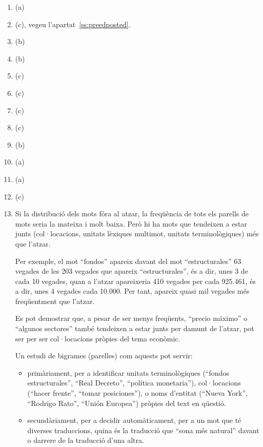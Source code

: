 \begin{enumerate}
\item (a)
\item (c), vegeu l'apartat~\ref{ss:preedposted}.
\item (b)
\item (b)
\item (c)
\item (c)
\item (c)
\item (c)
\item (b)
\item (a)
\item (a)
\item (c)
\item Si la distribució dels mots fóra al atzar, la freqüència de tots
  els parells de mots seria la mateixa i molt baixa. Però hi ha mots
  que tendeixen a estar junts (col·locacions, unitats lèxiques
  multimot, unitats terminològiques) més que l'atzar.

  Per exemple, el mot ``fondos'' apareix davant del mot
  ``estructurales'' 63 vegades de les 203 vegades que apareix
  ``estructurales'', és a dir, unes 3 de cada 10 vegades, quan a
  l'atzar apareixeria 410 vegades per cada 925.461, és a dir, unes 4
  vegades cada 10.000. Per tant, apareix quasi mil vegades més
  freqüentment que l'atzar.

  Es pot demostrar que, a pesar de ser menys freqüents, ``precio
  máximo'' o ``algunos sectores'' també tendeixen a estar junts per
  damunt de l'atzar, pot ser per ser col·locacions pròpies del tema
  econòmic.

  Un estudi de bigrames (parelles) com aquests pot servir:

  \begin{itemize}
  \item primàriament, per a identificar unitats terminològiques
    (``fondos estructurales'', ``Real Decreto'', ``política
    monetaria''), col·lo\-cacions (``hacer frente'', ``tomar
    posiciones''), o noms d'entitat (``Nueva York'', ``Rodrigo Rato'',
    ``Unión Europea'') pròpies del text en qüestió.
   
  \item secundàriament, per a decidir automàticament, per a un mot que
    té diverses traduccions, quina és la traducció que ``sona més
    natural'' davant o darrere de la traducció d'una altra.
   \end{itemize}


\end{enumerate}
